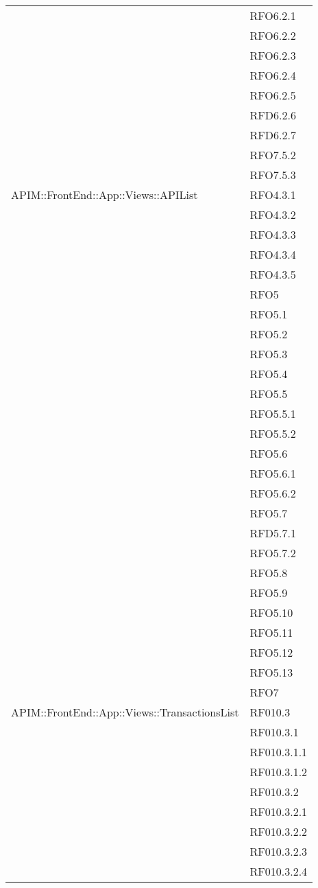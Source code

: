 \begin{longtable}{ p{12cm} | p{4cm} }
			& RFO6.2.1 \\
			& RFO6.2.2 \\
			& RFO6.2.3 \\
			& RFO6.2.4 \\
			& RFO6.2.5 \\
			& RFD6.2.6 \\
			& RFD6.2.7 \\
			& RFO7.5.2 \\
			& RFO7.5.3 \\
			\hline
			APIM::FrontEnd::App::Views::APIList
			& RFO4.3.1 \\
			& RFO4.3.2 \\
			& RFO4.3.3 \\
			& RFO4.3.4 \\
			& RFO4.3.5 \\
			& RFO5 \\
			& RFO5.1 \\
			& RFO5.2 \\
			& RFO5.3 \\
			& RFO5.4 \\
			& RFO5.5 \\
			& RFO5.5.1 \\
			& RFO5.5.2 \\
			& RFO5.6 \\
			& RFO5.6.1 \\
			& RFO5.6.2 \\
			& RFO5.7 \\
			& RFD5.7.1 \\
			& RFO5.7.2 \\
			& RFO5.8 \\
			& RFO5.9 \\
			& RFO5.10 \\
			& RFO5.11 \\
			& RFO5.12 \\
			& RFO5.13 \\
			& RFO7 \\
			\hline
			APIM::FrontEnd::App::Views::TransactionsList
			& RF010.3 \\
			& RF010.3.1 \\
			& RF010.3.1.1 \\
			& RF010.3.1.2 \\
			& RF010.3.2 \\
			& RF010.3.2.1 \\
			& RF010.3.2.2 \\
			& RF010.3.2.3 \\
			& RF010.3.2.4 \\

\end{longtable}
